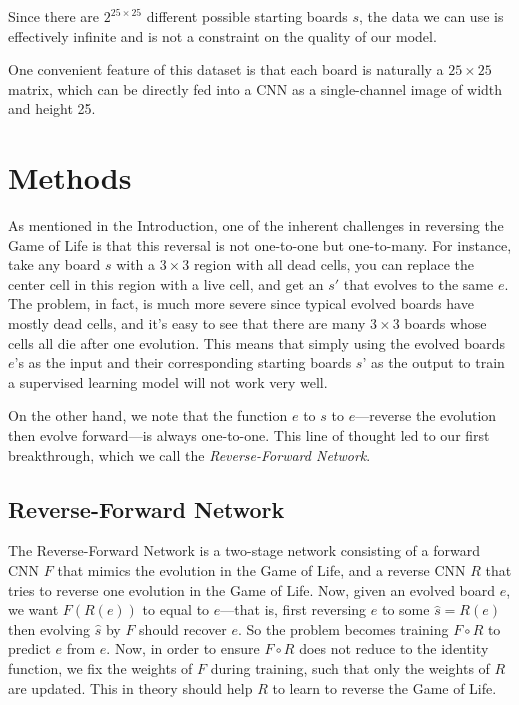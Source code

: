 \documentclass[conference]{IEEEtran}
\begin{document}
Since there are $2^{25 \times 25}$ different possible starting boards $s$, the data we can use is effectively infinite and is not a constraint on the quality of our model.


One convenient feature of this dataset is that each board is naturally a $25 \times 25$ matrix, which can be directly fed into a CNN as a single-channel image of width and height 25.

\section{Methods}
As mentioned in the Introduction, one of the inherent challenges in reversing the Game of Life is that this reversal is not one-to-one but one-to-many. For instance, take any board $s$ with a $3 \times 3$ region with all dead cells, you can replace the center cell in this region with a live cell, and get an $s'$ that evolves to the same $e$. The problem, in fact, is much more severe since typical evolved boards have mostly dead cells, and it's easy to see that there are many $3 \times 3$ boards whose cells all die after one evolution. This means that simply using the evolved boards $e$'s as the input and their corresponding starting boards $s$' as the output to train a supervised learning model will not work very well.

On the other hand, we note that the function $e$ to $s$ to $e$---reverse the evolution then evolve forward---is always one-to-one. This line of thought led to our first breakthrough, which we call the \emph{Reverse-Forward Network}.

\subsection{Reverse-Forward Network}
\label{revfwdnet}
The Reverse-Forward Network is a two-stage network consisting of a forward CNN $F$ that mimics the evolution in the Game of Life, and a reverse CNN $R$ that tries to reverse one evolution in the Game of Life. Now, given an evolved board $e$, we want $F(R(e))$ to equal to $e$---that is, first reversing $e$ to some $\hat s = R(e)$ then evolving $\hat s$ by $F$ should recover $e$. So the problem becomes training $F \circ R$ to predict $e$ from $e$. Now, in order to ensure $F \circ R$ does not reduce to the identity function, we fix the weights of $F$ during training, such that only the weights of $R$ are updated. This in theory should help $R$ to learn to reverse the Game of Life.
\end{document}

